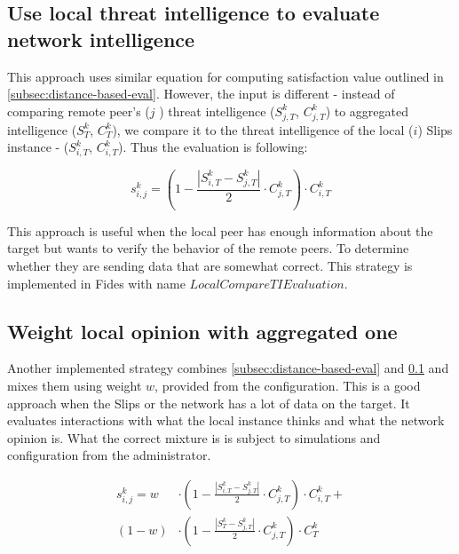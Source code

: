 \subsection{Use local threat intelligence to evaluate network intelligence}
\label{subsec:use-local-threat-to-evaluate}
This approach uses similar equation for computing satisfaction value outlined in \ref{subsec:distance-based-eval}. However, the input is different - instead of comparing remote peer's ($j$ ) threat intelligence ($S^{k}_{j, T}$, $C^{k}_{j, T}$) to aggregated intelligence ($S^{k}_{T}$, $C^{k}_{T}$), we compare it to the threat intelligence of the local ($i$) Slips instance - ($S^{k}_{i, T}$, $C^{k}_{i, T}$). Thus the evaluation is following:

\begin{equation}
s^{k}_{i, j} = \left(1 - \frac{|{S}^{k}_{i, T} - S^{k}_{j, T}|}{2} \cdot C^{k}_{j, T}\right) \cdot C^{k}_{i, T}
\end{equation}

This approach is useful when the local peer has enough information about the target but wants to verify the behavior of the remote peers.
To determine whether they are sending data that are somewhat correct. This strategy is implemented in Fides with name $LocalCompareTIEvaluation$.

\subsection{Weight local opinion with aggregated one}
\label{subsec:weight-local-opinion-with-aggregated-one}
Another implemented strategy combines \ref{subsec:distance-based-eval} and \ref{subsec:use-local-threat-to-evaluate} and mixes them using weight $w$, provided from the configuration.
This is a good approach when the Slips or the network has a lot of data on the target. It evaluates interactions with what the local instance thinks and what the network opinion is.
What the correct mixture is is subject to simulations and configuration from the administrator.

\begin{equation}
\begin{split}
    s^{k}_{i, j} = w &\cdot \left(1 - \frac{|{S}^{k}_{i, T} - S^{k}_{j, T}|}{2} \cdot C^{k}_{j, T}\right) \cdot C^{k}_{i, T} + \\
    (1-w) &\cdot \left(1 - \frac{|{S}^{k}_{T} - S^{k}_{j, T}|}{2} \cdot C^{k}_{j, T}\right) \cdot C^{k}_{T}
\end{split}
\end{equation}

